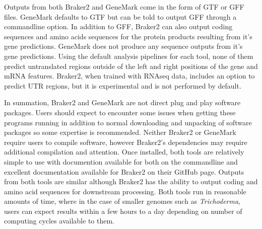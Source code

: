 Outputs from both Braker2 and GeneMark come in the form of GTF or GFF
files. GeneMark defaults to GTF but can be told to output GFF through
a commandline option. In addition to GFF, Braker2 can also output
coding sequences and amino acids sequences for the protein products
resulting from it's gene predictions. GeneMark does not produce any
sequence outputs from it's gene predictions. Using the default
analysis pipelines for each tool, none of them predict untranslated
regions outside of the left and right positions of the gene and mRNA
features. Braker2, when trained with RNAseq data, includes an option
to predict UTR regions, but it is experimental and is not performed by
default.

In summation, Braker2 and GeneMark are not direct plug and play
software packages. Users should expect to encounter some issues when
getting these programs running in addition to normal downloading and
unpacking of software packages so some expertise is
recommended. Neither Braker2 or GeneMark require users to compile
software, however Braker2's dependencies may require additional
compilation and attention. Once installed, both tools are relatively
simple to use with documention available for both on the commandline
and excellent documentation available for Braker2 on their GitHub
page. Outputs from both tools are similar although Braker2 has the
ability to output coding and amino acid sequences for downstream
processing. Both tools run in reasonable amounts of time, where in the
case of smaller genomes such as \textit{Trichoderma}, users can expect
results within a few hours to a day depending on number of computing
cycles available to them.
